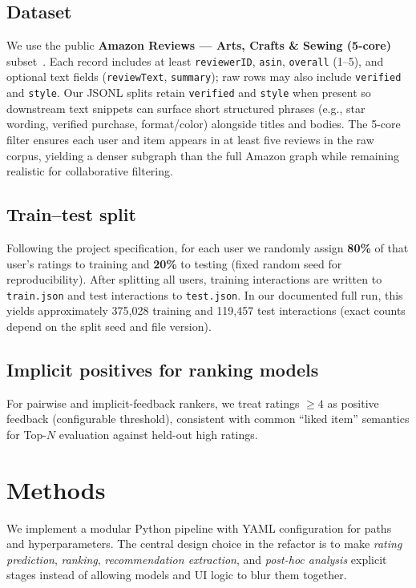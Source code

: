 \documentclass[sigconf,nonacm]{acmart}
\begin{document}
\subsection{Dataset}
We use the public \textbf{Amazon Reviews --- Arts, Crafts \& Sewing (5-core)} subset~\cite{amazon5core}. Each record includes at least \texttt{reviewerID}, \texttt{asin}, \texttt{overall} (1--5), and optional text fields (\texttt{reviewText}, \texttt{summary}); raw rows may also include \texttt{verified} and \texttt{style}. Our JSONL splits retain \texttt{verified} and \texttt{style} when present so downstream text snippets can surface short structured phrases (e.g., star wording, verified purchase, format/color) alongside titles and bodies. The 5-core filter ensures each user and item appears in at least five reviews in the raw corpus, yielding a denser subgraph than the full Amazon graph while remaining realistic for collaborative filtering.

\subsection{Train--test split}
Following the project specification, for each user we randomly assign \textbf{80\%} of that user's ratings to training and \textbf{20\%} to testing (fixed random seed for reproducibility). After splitting all users, training interactions are written to \texttt{train.json} and test interactions to \texttt{test.json}. In our documented full run, this yields approximately 375{,}028 training and 119{,}457 test interactions (exact counts depend on the split seed and file version).

\subsection{Implicit positives for ranking models}
For pairwise and implicit-feedback rankers, we treat ratings $\geq 4$ as positive feedback (configurable threshold), consistent with common ``liked item'' semantics for Top-$N$ evaluation against held-out high ratings.

\section{Methods}
We implement a modular Python pipeline with YAML configuration for paths and hyperparameters. The central design choice in the refactor is to make \emph{rating prediction}, \emph{ranking}, \emph{recommendation extraction}, and \emph{post-hoc analysis} explicit stages instead of allowing models and UI logic to blur them together.
\end{document}

